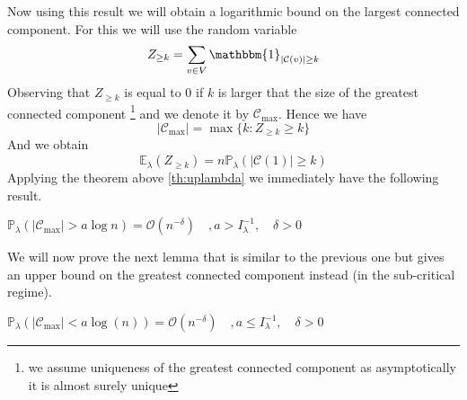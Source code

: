 Now using this result we will obtain a logarithmic bound on the largest connected component.
\newline
For this we will use the random variable 
\begin{equation}
	Z_{\geq k } = \sum_{v \in V} \mathbbm{1}_{|\mathcal{C}(v)| \geq k}
\end{equation}
Observing that $Z_{\geq k}$ is equal to 0 if $k$ is larger that the size of the greatest connected component \footnote{ we assume uniqueness of the greatest connected component as asymptotically it is almost surely unique } and we denote it by $\mathcal{C}_{\max}$. Hence we have
\begin{equation}
	|\mathcal{C}_{\max}| = \max\{k: Z_{\geq k} \geq k\}
\end{equation}
And we obtain 
\begin{equation}\label{eq:nexplambda}
	\mathbb{E}_{\lambda}(Z_{\geq k}) = n \mathbb{P}_{\lambda}(|\mathcal{C}(1)| \geq k)
\end{equation}
Applying the theorem above \ref{th:uplambda} we immediately have the following result.
\begin{lemma}\label{lemmalambdainf}
	$\mathbb{P}_{\lambda}(|\mathcal{C}_{\max}| > a \log n) = \mathcal{O}(n^{-\delta}) \quad, a > I_{\lambda}^{-1}, \quad \delta > 0$
\end{lemma}
We will now prove the next lemma that is similar to the previous one but gives an upper bound on the greatest connected component instead (in the sub-critical regime).
\begin{lemma}\label{lemmalambdasup}
	$\mathbb{P}_{\lambda}(|\mathcal{C}_{\max}| < a\log(n)) = \mathcal{O}(n^{-\delta})\quad, a\leq I_{\lambda}^{-1}, \quad \delta >0$
\end{lemma}
